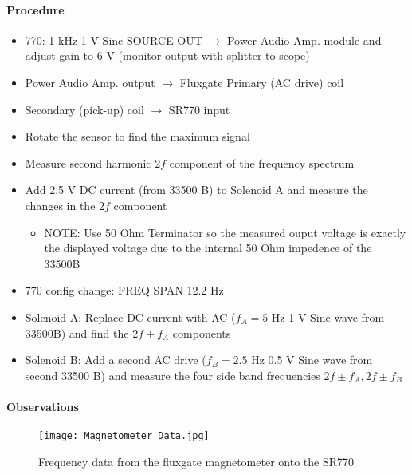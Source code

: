 \documentclass[../main.tex]{subfiles}
\begin{document}
\paragraph{Procedure}
\begin{itemize}
    \item 770: 1 kHz 1 V Sine SOURCE OUT $\to$ Power Audio Amp. module and adjust gain to 6 V (monitor output with splitter to scope)
    \item Power Audio Amp. output $\to$ Fluxgate Primary (AC drive) coil
    \item Secondary (pick-up) coil $\to$ SR770 input
    \item Rotate the sensor to find the maximum signal 
    \item Measure second harmonic $2f$ component of the frequency spectrum
    \item Add 2.5 V DC current (from 33500 B) to Solenoid A and measure the changes in the $2f$ component
    \begin{itemize}
        \item NOTE: Use 50 Ohm Terminator so the measured ouput voltage is exactly the displayed voltage due to the internal 50 Ohm impedence of the 33500B
    \end{itemize}
    \item 770 config change: FREQ SPAN 12.2 Hz
    \item Solenoid A: Replace DC current with AC ($f_A = 5$ Hz 1 V Sine wave from 33500B) and find the $2f \pm f_A$ components
    \item Solenoid B: Add a second AC drive ($f_B = 2.5$ Hz 0.5 V Sine wave from second 33500 B) and measure the four side band frequencies $2f \pm f_A, 2f \pm f_B$
\end{itemize}

\newpage
\paragraph{Observations}
\begin{figure}[ht]
    \centering
    \texttt{[image: Magnetometer Data.jpg]}
    \caption{Frequency data from the fluxgate magnetometer onto the SR770}
    \label{fig:mag data}
\end{figure}
\end{document}
